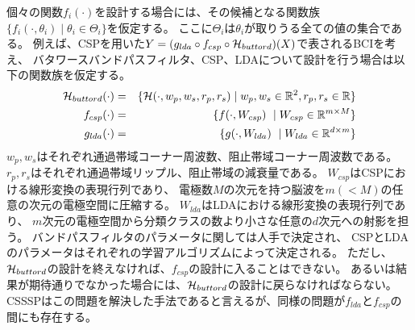 個々の関数\(f_i(\cdot)\)を設計する場合には、その候補となる関数族\(\{f_i(\cdot,\theta_i)\mid \theta_i \in \Theta_i\}\)を仮定する。
ここに\(\Theta_i\)は\(\theta_i\)が取りうる全ての値の集合である。
例えば、CSPを用いた\(Y = (g_{lda}\circ f_{csp} \circ {{\cal H}_{buttord}})(X)\)で表されるBCIを考え、
バタワースバンドパスフィルタ、CSP、LDAについて設計を行う場合は以下の関数族を仮定する。
\begin{eqnarray}
    {\cal H}_{buttord}(\cdot) &=& \{{\cal H}(\cdot,w_p,w_s,r_p,r_s) \mid w_p,w_s \in \mathbb R^2, r_p,r_s \in \mathbb R\} \\
    \label{eq:H_buttord}
    f_{csp}(\cdot) &=& \{f(\cdot, W_{csp})\ \mid W_{csp} \in \mathbb R^{m\times M} \}\\
    \label{eq:f_csp}
    g_{lda}(\cdot) &=& \{g(\cdot,W_{lda})\ \mid W_{lda} \in \mathbb R^{d \times m}\}    
    \label{eq:g_lda}
\end{eqnarray}
\(w_p,w_s\)はそれぞれ通過帯域コーナー周波数、阻止帯域コーナー周波数である。
\(r_p,r_s\)はそれぞれ通過帯域リップル、阻止帯域の減衰量である。
\(W_{csp}\)はCSPにおける線形変換の表現行列であり、
電極数\(M\)の次元を持つ脳波を\(m (< M)\)の任意の次元の電極空間に圧縮する。
\(W_{lda}\)はLDAにおける線形変換の表現行列であり、
\(m\)次元の電極空間から分類クラスの数より小さな任意の\(d\)次元への射影を担う。
バンドパスフィルタのパラメータに関しては人手で決定され、
CSPとLDAのパラメータはそれぞれの学習アルゴリズムによって決定される。
ただし、\({\cal H}_{buttord}\)の設計を終えなければ、\(f_{csp}\)の設計に入ることはできない。
あるいは結果が期待通りでなかった場合には、\({\cal H}_{buttord}\)の設計に戻らなければならない。
CSSSPはこの問題を解決した手法であると言えるが、同様の問題が\(f_{lda}\)と\(f_{csp}\)の間にも存在する。




